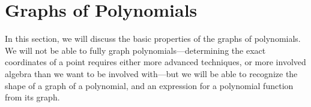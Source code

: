 \section{Graphs of Polynomials}
In this section, we will discuss the basic properties of the graphs of polynomials. We will not be able to fully graph polynomials---determining the exact coordinates of a point requires either more advanced techniques, or more involved algebra than we want to be involved with---but we will be able to recognize the shape of a graph of a polynomial, and an expression for a polynomial function from its graph.

 
% 
 
 
 
 
% 
% 
